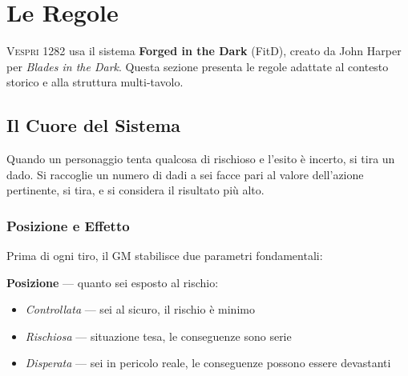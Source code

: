 
\chapter{Le Regole}

\lettrine[lines=3]{V}{espri} 1282 usa il sistema \textbf{Forged in the Dark}
(FitD), creato da John Harper per \textit{Blades in the Dark}. Questa sezione
presenta le regole adattate al contesto storico e alla struttura multi-tavolo.

\section{Il Cuore del Sistema}

Quando un personaggio tenta qualcosa di rischioso e l'esito è incerto,
si tira un dado. Si raccoglie un numero di dadi a sei facce pari al valore
dell'azione pertinente, si tira, e si considera il risultato più alto.


\subsection{Posizione e Effetto}

Prima di ogni tiro, il GM stabilisce due parametri fondamentali:

\textbf{Posizione} — quanto sei esposto al rischio:
\begin{itemize}[nosep]
  \item \textit{Controllata} — sei al sicuro, il rischio è minimo
  \item \textit{Rischiosa} — situazione tesa, le conseguenze sono serie
  \item \textit{Disperata} — sei in pericolo reale, le conseguenze possono essere devastanti
\end{itemize}

